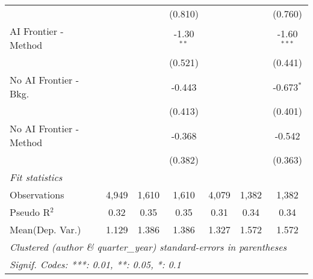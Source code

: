 \begin{tabular}{lcccccc}
                           &              &              & (0.810)      &               &               & (0.760)\\   
   AI Frontier - Method    &              &              & -1.30$^{**}$ &               &               & -1.60$^{***}$\\   
                           &              &              & (0.521)      &               &               & (0.441)\\   
   No AI Frontier - Bkg.   &              &              & -0.443       &               &               & -0.673$^{*}$\\   
                           &              &              & (0.413)      &               &               & (0.401)\\   
   No AI Frontier - Method &              &              & -0.368       &               &               & -0.542\\   
                           &              &              & (0.382)      &               &               & (0.363)\\   
   \midrule
   \emph{Fit statistics}\\
   Observations            & 4,949        & 1,610        & 1,610        & 4,079         & 1,382         & 1,382\\  
   Pseudo R$^2$            & 0.32         & 0.35         & 0.35         & 0.31          & 0.34          & 0.34\\  
Mean(Dep. Var.) & 1.129 & 1.386 & 1.386 & 1.327 & 1.572 & 1.572 \\
   \midrule \midrule
   \multicolumn{7}{l}{\emph{Clustered (author \& quarter\_year) standard-errors in parentheses}}\\
   \multicolumn{7}{l}{\emph{Signif. Codes: ***: 0.01, **: 0.05, *: 0.1}}\\
\end{tabular}
\par\endgroup

